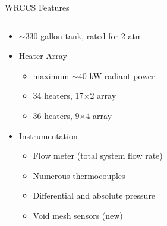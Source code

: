 \documentclass[10pt,t,xcolor=table]{UWMadBeamer}
\begin{document}
\begin{frame}{WRCCS Features}
    \begin{columns}
        \begin{column}{0.71\paperwidth}
        
            \begin{itemize}
                \item $\sim$330 gallon tank, rated for 2 atm
                \item Heater Array
                \begin{itemize}
                    \item maximum $\sim$40 kW radiant power
                    \item<1-> 34 heaters, 17$\times$2 array 
                    \item<2-> 36 heaters, 9$\times$4 array 
                \end{itemize}
                \item Instrumentation
                \begin{itemize}
                    \item Flow meter (total system flow rate)
                    \item Numerous thermocouples
                    \item Differential and absolute pressure
                    \item<2-> Void mesh sensors (new)
                \end{itemize}
            \end{itemize}
        \vfill
\end{column}
\end{columns}
\end{frame}
\end{document}
